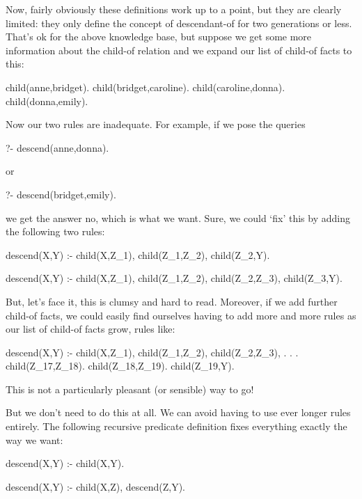 Now, fairly obviously these definitions work up to a point, but they are
clearly limited: they only define the concept of
descendant-of for two generations or less.  That's ok for the above
knowledge base, but suppose we get some more information about the
child-of relation and we expand our list of child-of facts to this:
\begin{LPNcodedisplay}
child(anne,bridget).
child(bridget,caroline).
child(caroline,donna).
child(donna,emily).
\end{LPNcodedisplay}

Now our two rules are inadequate.  For example, if we pose the queries
\begin{LPNcodedisplay}
?- descend(anne,donna).
\end{LPNcodedisplay}
or
\begin{LPNcodedisplay}
?- descend(bridget,emily).
\end{LPNcodedisplay}
we get the answer no, which is  what we want.  Sure,
we could `fix' this by adding the following two rules:
\begin{LPNcodedisplay}
descend(X,Y) :- child(X,Z_1),
                 child(Z_1,Z_2),
                 child(Z_2,Y).

descend(X,Y) :- child(X,Z_1),
                 child(Z_1,Z_2),
                 child(Z_2,Z_3),
                 child(Z_3,Y).
\end{LPNcodedisplay}

But, let's face it, this is clumsy and hard to read.  Moreover, if we
add further child-of facts, we could easily find ourselves having to
add more and more rules as our list of child-of facts grow, rules
like:
\begin{LPNcodedisplay}
descend(X,Y) :- child(X,Z_1),
                 child(Z_1,Z_2),
                 child(Z_2,Z_3),
                                        .
                     .
                     .
                 child(Z_17,Z_18).
                 child(Z_18,Z_19).
                 child(Z_19,Y).
\end{LPNcodedisplay}
This is not a particularly pleasant (or sensible) way to go!

But we don't need to do this at all. We can avoid
having to use ever longer rules entirely. The
following  recursive predicate definition fixes everything exactly
the way we want:
\begin{LPNcodedisplay}
descend(X,Y) :- child(X,Y).

descend(X,Y) :- child(X,Z),
                 descend(Z,Y).
\end{LPNcodedisplay}



